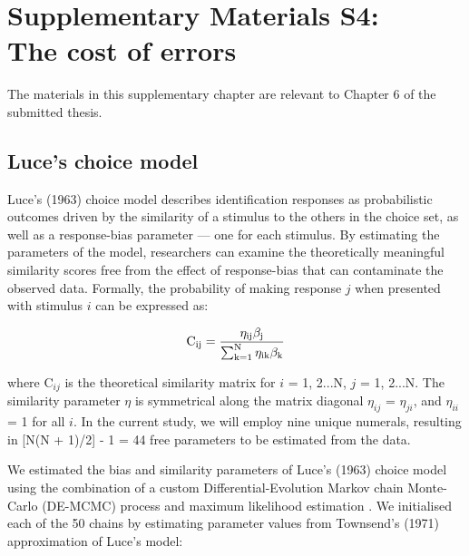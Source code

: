 \chapter{Supplementary Materials S4: \\ The cost of errors}
\label{Appendix:D_WheelTask}

\setcounter{equation}{0}
\setcounter{figure}{0}
\setcounter{table}{0}
\setcounter{section}{0}
\renewcommand\thefigure{S4\thesection.\arabic{figure}}
\renewcommand\thetable{S4\thesection.\arabic{table}}

\noindent The materials in this supplementary chapter are relevant to Chapter 6 of the submitted thesis.

\newpage

\section{Luce's choice model}
\label{Appendix:Luce}

Luce’s (1963) choice model describes identification responses as probabilistic outcomes driven by the similarity of a stimulus to the others in the choice set, as well as a response-bias parameter --- one for each stimulus. By estimating the parameters of the model, researchers can examine the theoretically meaningful similarity scores free from the effect of response-bias that can contaminate the observed data. Formally, the probability of making response $j$ when presented with stimulus $i$ can be expressed as:

\begin{equation}
    \rm C_{ij} = \frac{ \eta_{ij} \beta_{j} }{ \sum_{k=1}^{N}  \eta_{ik} \beta_{k} }
    \label{Eq:Luce}
\end{equation}

\noindent 
where C$_{ij}$ is the theoretical similarity matrix for $i$ = 1, 2...N, $j$ = 1, 2...N. The similarity parameter $\eta$ is symmetrical along the matrix diagonal \ie $\eta_{ij}$ = $\eta_{ji}$, and $\eta_{ii}$ = 1 for all $i$. In the current study, we will employ nine unique numerals, resulting in [N(N + 1)/2] - 1 = 44 free parameters to be estimated from the data.

We estimated the bias and similarity parameters of Luce’s (1963) choice model using the combination of a custom Differential-Evolution Markov chain Monte-Carlo (DE-MCMC) process and maximum likelihood estimation \cite{myung2003tutorial}. We initialised each of the 50 chains by estimating parameter values from Townsend's (1971) approximation of Luce's model:

